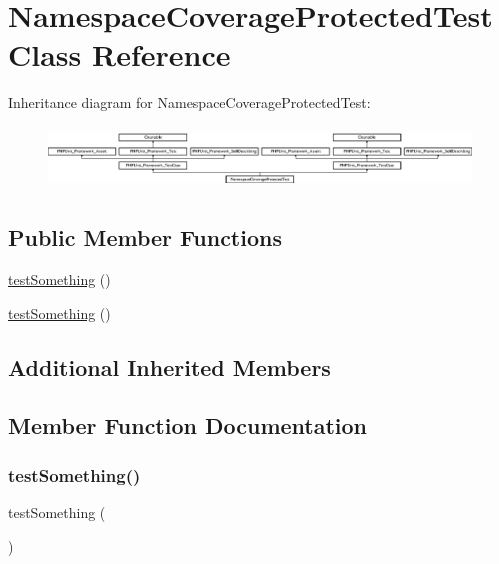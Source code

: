 \hypertarget{class_namespace_coverage_protected_test}{}\section{Namespace\+Coverage\+Protected\+Test Class Reference}
\label{class_namespace_coverage_protected_test}
Inheritance diagram for Namespace\+Coverage\+Protected\+Test\+:\begin{figure}[H]
\begin{center}
\leavevmode
\includegraphics[height=1.651917cm]{class_namespace_coverage_protected_test}
\end{center}
\end{figure}
\subsection*{Public Member Functions}
\begin{DoxyCompactItemize}
\item 
\mbox{\hyperlink{class_namespace_coverage_protected_test_a0fc4e17369bc9607ebdd850d9eda8167}{test\+Something}} ()
\item 
\mbox{\hyperlink{class_namespace_coverage_protected_test_a0fc4e17369bc9607ebdd850d9eda8167}{test\+Something}} ()
\end{DoxyCompactItemize}
\subsection*{Additional Inherited Members}


\subsection{Member Function Documentation}
\mbox{\label{class_namespace_coverage_protected_test_a0fc4e17369bc9607ebdd850d9eda8167}} 
\subsubsection{\texorpdfstring{test\+Something()}{testSomething()}\hspace{0.1cm}{\footnotesize\ttfamily [1/2]}}
{\footnotesize\ttfamily test\+Something (\begin{DoxyParamCaption}{ }\end{DoxyParamCaption})}

